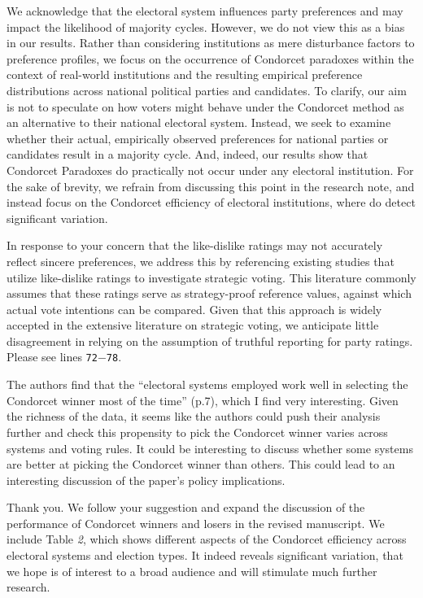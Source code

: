 \documentclass[a4paper, 12pt]{scrartcl}
\theoremstyle{break}
\newenvironment{changes}{\par\color{violet}\par\addvspace{\baselineskip}}{\par\addvspace{\baselineskip}}
\begin{document}
We acknowledge that the electoral system influences party preferences and may impact the likelihood of majority cycles. However, we do not view this as a bias in our results. Rather than considering institutions as mere disturbance factors to preference profiles, we focus on the occurrence of Condorcet paradoxes within the context of real-world institutions and the resulting empirical preference distributions across national political parties and candidates. To clarify, our aim is not to speculate on how voters might behave under the Condorcet method as an alternative to their national electoral system. Instead, we seek to examine whether their actual, empirically observed preferences for national parties or candidates result in a majority cycle. And, indeed, our results show that Condorcet Paradoxes do practically not occur under any electoral institution. For the sake of brevity, we refrain from discussing this point in the research note, and instead focus on the Condorcet efficiency of electoral institutions, where do detect significant variation.

In response to your concern that the like-dislike ratings may not accurately reflect sincere preferences, we address this by referencing existing studies that utilize like-dislike ratings to investigate strategic voting. This literature commonly assumes that these ratings serve as strategy-proof reference values, against which actual vote intentions can be compared. Given that this approach is widely accepted in the extensive literature on strategic voting, we anticipate little disagreement in relying on the assumption of truthful reporting for party ratings. Please see lines \texttt{72$-$78}. 


\begin{changes}
The authors ﬁnd that the “electoral systems employed work well in selecting the Condorcet winner most of the time” (p.7), which I ﬁnd very interesting. Given the richness of the data, it seems like the authors could push their analysis further and check this propensity to pick the 	Condorcet winner varies across systems and voting rules. It could be interesting to discuss whether some systems are better at picking the Condorcet winner than others. This could lead to an interesting discussion of the paper’s policy implications.
\end{changes}

Thank you. We follow your suggestion and expand the discussion of the performance of Condorcet winners and losers in the revised manuscript. We include Table \emph{2}, which shows different aspects of the Condorcet efficiency across electoral systems and election types. It indeed reveals significant variation, that we hope is of interest to a broad audience and will stimulate much further research. 
\end{document}
